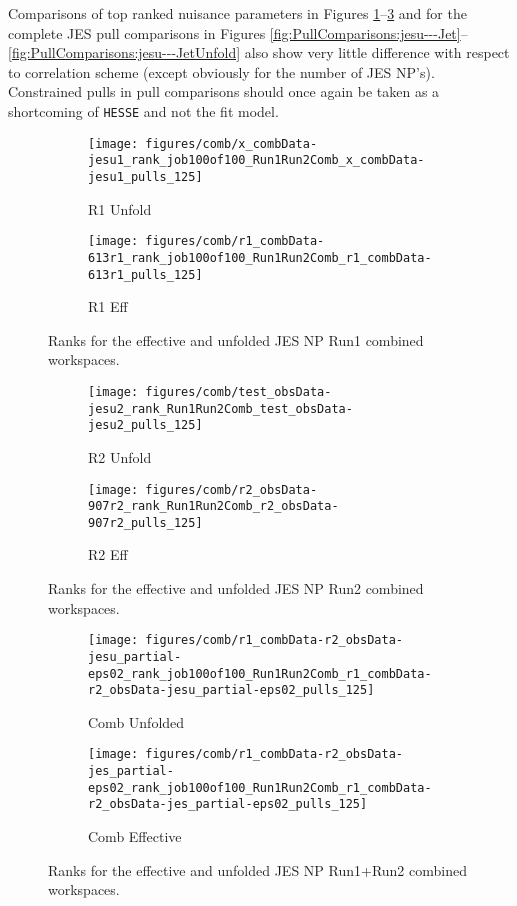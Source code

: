 Comparisons of top ranked nuisance parameters in Figures \ref{fig:Ranks:jesu1}--\ref{fig:Ranks:jesuc} and for the complete JES pull comparisons in Figures \ref{fig:PullComparisons:jesu---Jet}--\ref{fig:PullComparisons:jesu---JetUnfold} also show very little difference with respect to correlation scheme (except obviously for the number of JES NP's).  Constrained pulls in pull comparisons should once again be taken as a shortcoming of \texttt{HESSE} and not the fit model.
\begin{figure}[!htbp]\captionsetup{justification=centering}
  \centering
\begin{subfigure}[t]{0.45000\textwidth}\centering\texttt{[image: figures/comb/x\_combData-jesu1\_rank\_job100of100\_Run1Run2Comb\_x\_combData-jesu1\_pulls\_125]}\caption{R1 Unfold}\end{subfigure}
\begin{subfigure}[t]{0.45000\textwidth}\centering\texttt{[image: figures/comb/r1\_combData-613r1\_rank\_job100of100\_Run1Run2Comb\_r1\_combData-613r1\_pulls\_125]}\caption{R1 Eff}\end{subfigure}
  \caption{Ranks for the effective and unfolded JES NP Run1 combined workspaces.}
    \label{fig:Ranks:jesu1}
\end{figure}

\begin{figure}[!htbp]\captionsetup{justification=centering}
  \centering
\begin{subfigure}[t]{0.45000\textwidth}\centering\texttt{[image: figures/comb/test\_obsData-jesu2\_rank\_Run1Run2Comb\_test\_obsData-jesu2\_pulls\_125]}\caption{R2 Unfold}\end{subfigure}
\begin{subfigure}[t]{0.45000\textwidth}\centering\texttt{[image: figures/comb/r2\_obsData-907r2\_rank\_Run1Run2Comb\_r2\_obsData-907r2\_pulls\_125]}\caption{R2 Eff}\end{subfigure}
  \caption{Ranks for the effective and unfolded JES NP Run2 combined workspaces.}
    \label{fig:Ranks:jesu2}
\end{figure}

\begin{figure}[!htbp]\captionsetup{justification=centering}
  \centering
\begin{subfigure}[t]{0.45\textwidth}\centering\texttt{[image: figures/comb/r1\_combData-r2\_obsData-jesu\_partial-eps02\_rank\_job100of100\_Run1Run2Comb\_r1\_combData-r2\_obsData-jesu\_partial-eps02\_pulls\_125]}\caption{Comb Unfolded}\end{subfigure}
\begin{subfigure}[t]{0.45\textwidth}\centering\texttt{[image: figures/comb/r1\_combData-r2\_obsData-jes\_partial-eps02\_rank\_job100of100\_Run1Run2Comb\_r1\_combData-r2\_obsData-jes\_partial-eps02\_pulls\_125]}\caption{Comb Effective}\end{subfigure}
  \caption{Ranks for the effective and unfolded JES NP Run1+Run2 combined workspaces.}
    \label{fig:Ranks:jesuc}
\end{figure}

